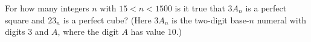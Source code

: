 For how many integers $n$ with $15<n<1500$ is it true that $3A_n$ is a perfect square and $23_n$ is a perfect cube? (Here $3A_n$ is the two-digit base-$n$ numeral with digits $3$ and $A$, where the digit $A$ has value $10$.)
